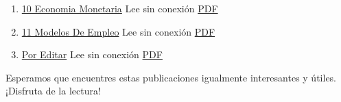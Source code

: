 \documentclass[
  jou,
  floatsintext,
  longtable,
  a4paper,
  nolmodern,
  notxfonts,
  notimes,
  colorlinks=true,linkcolor=blue,citecolor=blue,urlcolor=blue]{apa7}
\begin{document}
\begin{enumerate}
{  Crecimiento Economico} Lee sin conexión
  \href{https://achalmaedison.netlify.app/macroeconomia/posts/2022-01-17-09-crecimiento-economico/index.pdf}{PDF}
\item
  \href{https://achalmaedison.netlify.app/macroeconomia/posts/2022-01-24-10-economia-monetaria}{10
  Economia Monetaria} Lee sin conexión
  \href{https://achalmaedison.netlify.app/macroeconomia/posts/2022-01-24-10-economia-monetaria/index.pdf}{PDF}
\item
  \href{https://achalmaedison.netlify.app/macroeconomia/posts/2022-01-31-11-modelos-de-empleo}{11
  Modelos De Empleo} Lee sin conexión
  \href{https://achalmaedison.netlify.app/macroeconomia/posts/2022-01-31-11-modelos-de-empleo/index.pdf}{PDF}
\item
  \href{https://achalmaedison.netlify.app/macroeconomia/posts/2024-03-31-por-editar}{Por
  Editar} Lee sin conexión
  \href{https://achalmaedison.netlify.app/macroeconomia/posts/2024-03-31-por-editar/index.pdf}{PDF}
\end{enumerate}

Esperamos que encuentres estas publicaciones igualmente interesantes y
útiles. ¡Disfruta de la lectura!
\end{document}
